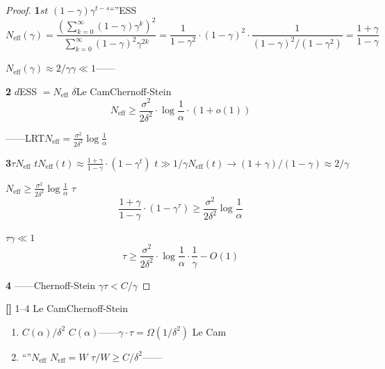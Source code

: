 \documentclass[11pt,a4paper]{article}
\theoremstyle{remark}
\newcommand{\rigorous}{\textnormal{\textbf{[]}}}
\begin{document}
\begin{proof}
\textbf{1}$s$$t$
$(1-\gamma)\gamma^{t-s}$``''ESS
\begin{equation}
    N_{\text{eff}}(\gamma) = \frac{(\sum_{k=0}^{\infty} (1-\gamma)\gamma^k)^2}{\sum_{k=0}^{\infty} (1-\gamma)^2\gamma^{2k}}
    = \frac{1}{1-\gamma^2} \cdot (1-\gamma)^2 \cdot \frac{1}{(1-\gamma)^2/(1-\gamma^2)}
    = \frac{1+\gamma}{1-\gamma}
\end{equation}

$N_{\text{eff}}(\gamma) \approx 2/\gamma$$\gamma \ll 1$——


\textbf{2}
$d$ESS $= N_{\text{eff}}$
$\delta$Le CamChernoff-Stein
\begin{equation}
    N_{\text{eff}} \geq \frac{\sigma^2}{2\delta^2} \cdot \log\frac{1}{\alpha} \cdot (1 + o(1))
\end{equation}

——LRT$N_{\text{eff}} = \frac{\sigma^2}{2\delta^2}\log\frac{1}{\alpha}$


\textbf{3}$\tau$$N_{\text{eff}}$
\textbf{}$t$$N_{\text{eff}}(t) \approx \frac{1+\gamma}{1-\gamma} \cdot (1 - \gamma^t)$
$t \gg 1/\gamma$$N_{\text{eff}}(t) \to (1+\gamma)/(1-\gamma) \approx 2/\gamma$

$N_{\text{eff}} \geq \frac{\sigma^2}{2\delta^2}\log\frac{1}{\alpha}$
$\tau$
\begin{equation}
    \frac{1+\gamma}{1-\gamma} \cdot (1 - \gamma^\tau) \geq \frac{\sigma^2}{2\delta^2}\log\frac{1}{\alpha}
\end{equation}

$\tau$$\gamma \ll 1$
\begin{equation}
    \tau \geq \frac{\sigma^2}{2\delta^2} \cdot \log\frac{1}{\alpha} \cdot \frac{1}{\gamma} - O(1)
\end{equation}

\textbf{4}
——Chernoff-Stein
$\gamma$$\tau < C/\gamma$
\end{proof}

\rigorous{} \textbf{}1--4
Le CamChernoff-Stein
\textbf{}
\begin{enumerate}[label=(\arabic*)]
    \item $C(\alpha)/\delta^2$
          $C(\alpha)$——$\gamma \cdot \tau = \Omega(1/\delta^2)$
          Le Cam
    \item ``''$N_{\text{eff}}$
          $N_{\text{eff}} = W$
          $\tau/W \geq C/\delta^2$——
\end{enumerate}

\subsection{}
\end{document}
